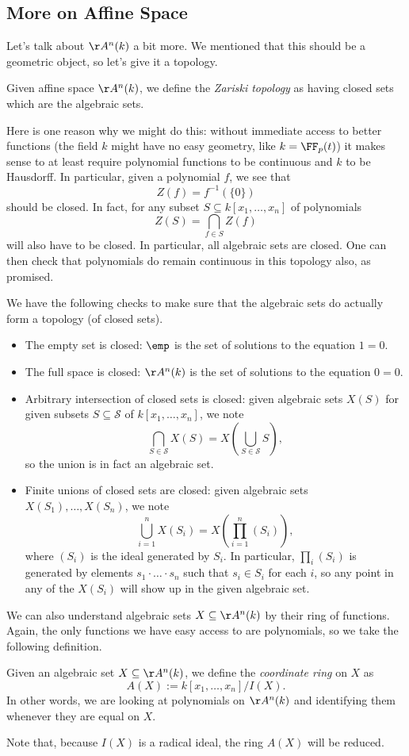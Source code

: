 \subsection{More on Affine Space}
Let's talk about $\AA^n(k)$ a bit more. We mentioned that this should be a geometric object, so let's give it a topology.
\begin{definition}
	Given affine space $\AA^n(k)$, we define the \textit{Zariski topology} as having closed sets which are the algebraic sets.
\end{definition}
\begin{remark}[Nir]
	Here is one reason why we might do this: without immediate access to better functions (the field $k$ might have no easy geometry, like $k=\FF_p(t)$) it makes sense to at least require polynomial functions to be continuous and $k$ to be Hausdorff. In particular, given a polynomial $f$, we see that
	\[Z(f)=f^{-1}(\{0\})\]
	should be closed. In fact, for any subset $S\subseteq k[x_1,\ldots,x_n]$ of polynomials
	\[Z(S)=\bigcap_{f\in S}Z(f)\]
	will also have to be closed. In particular, all algebraic sets are closed. One can then check that polynomials do remain continuous in this topology also, as promised.
\end{remark}
We have the following checks to make sure that the algebraic sets do actually form a topology (of closed sets).
\begin{itemize}
	\item The empty set is closed: $\emp$ is the set of solutions to the equation $1=0$.
	\item The full space is closed: $\AA^n(k)$ is the set of solutions to the equation $0=0$.
	\item Arbitrary intersection of closed sets is closed: given algebraic sets $X(S)$ for given subsets $S\subseteq\mathcal S$ of $k[x_1,\ldots,x_n]$, we note
	\[\bigcap_{S\in\mathcal S}X(S)=X\left(\bigcup_{S\in\mathcal S}S\right),\]
	so the union is in fact an algebraic set.
	\item Finite unions of closed sets are closed: given algebraic sets $X(S_1),\ldots,X(S_n)$, we note
	\[\bigcup_{i=1}^nX(S_i)=X\left(\prod_{i=1}^n(S_i)\right),\]
	where $(S_i)$ is the ideal generated by $S_i$. In particular, $\prod_i(S_i)$ is generated by elements $s_1\cdot\ldots\cdot s_n$ such that $s_i\in S_i$ for each $i$, so any point in any of the $X(S_i)$ will show up in the given algebraic set.
\end{itemize}
We can also understand algebraic sets $X\subseteq\AA^n(k)$ by their ring of functions. Again, the only functions we have easy access to are polynomials, so we take the following definition.
\begin{definition}
	Given an algebraic set $X\subseteq\AA^n(k)$, we define the \textit{coordinate ring} on $X$ as
	\[A(X):=k[x_1,\ldots,x_n]/I(X).\]
	In other words, we are looking at polynomials on $\AA^n(k)$ and identifying them whenever they are equal on $X$.
\end{definition}
Note that, because $I(X)$ is a radical ideal, the ring $A(X)$ will be reduced.

